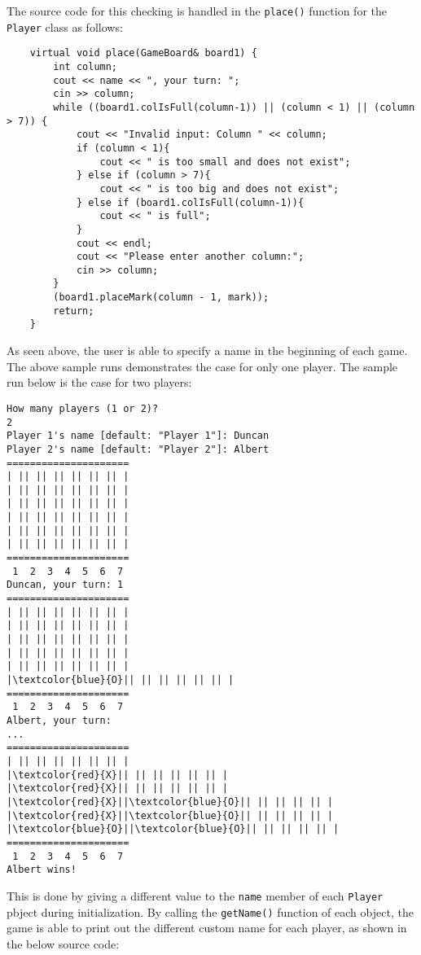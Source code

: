 \documentclass{article}
\begin{document}
The source code for this checking is handled in the \texttt{place()} function for the \texttt{Player} class as follows:
\begin{verbatim}
    virtual void place(GameBoard& board1) {
        int column;
        cout << name << ", your turn: ";
        cin >> column;
        while ((board1.colIsFull(column-1)) || (column < 1) || (column
> 7)) {
            cout << "Invalid input: Column " << column;
            if (column < 1){
                cout << " is too small and does not exist";
            } else if (column > 7){
                cout << " is too big and does not exist";
            } else if (board1.colIsFull(column-1)){
                cout << " is full";
            }
            cout << endl;
            cout << "Please enter another column:";
            cin >> column;
        }
        (board1.placeMark(column - 1, mark));
        return;
    }
\end{verbatim}
\pagebreak
As seen above, the user is able to specify a name in the beginning of each game. The above sample runs demonstrates the case for only one player. The sample run below is the case for two players:
\begin{Verbatim}[commandchars=\\\{\}]
How many players (1 or 2)?
2
Player 1's name [default: "Player 1"]: Duncan
Player 2's name [default: "Player 2"]: Albert
=====================
| || || || || || || |
| || || || || || || |
| || || || || || || |
| || || || || || || |
| || || || || || || |
| || || || || || || |
=====================
 1  2  3  4  5  6  7
Duncan, your turn: 1
=====================
| || || || || || || |
| || || || || || || |
| || || || || || || |
| || || || || || || |
| || || || || || || |
|\textcolor{blue}{O}|| || || || || || |
=====================
 1  2  3  4  5  6  7
Albert, your turn:
...
=====================
| || || || || || || |
|\textcolor{red}{X}|| || || || || || |
|\textcolor{red}{X}|| || || || || || |
|\textcolor{red}{X}||\textcolor{blue}{O}|| || || || || |
|\textcolor{red}{X}||\textcolor{blue}{O}|| || || || || |
|\textcolor{blue}{O}||\textcolor{blue}{O}|| || || || || |
=====================
 1  2  3  4  5  6  7
Albert wins!
\end{Verbatim}
This is done by giving a different value to the \texttt{name} member of each \texttt{Player} pbject during initialization. By calling the \texttt{getName()} function of each object, the game is able to print out the different custom name for each player, as shown in the below source code:
\end{document}
